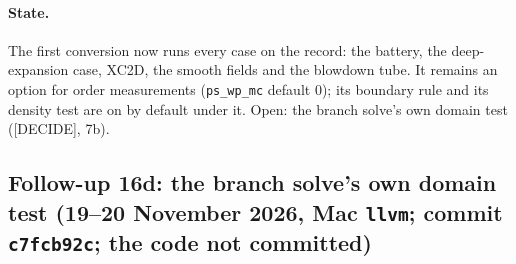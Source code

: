 \documentclass[11pt,a4paper]{article}
\newcommand{\code}[1]{\texttt{\small #1}}
\begin{document}
\paragraph{State.}  The first conversion now runs every case on the
record: the battery, the deep-expansion case, XC2D, the smooth fields
and the blowdown tube.  It remains an option for order measurements
(\code{ps\_wp\_mc} default 0); its boundary rule and its density test
are on by default under it.  Open: the branch solve's own domain test
([DECIDE], 7b).


\subsection{Follow-up 16d: the branch solve's own domain test (19--20 November 2026, Mac \code{llvm}; commit \code{c7fcb92c}; the code not committed)}
\end{document}
